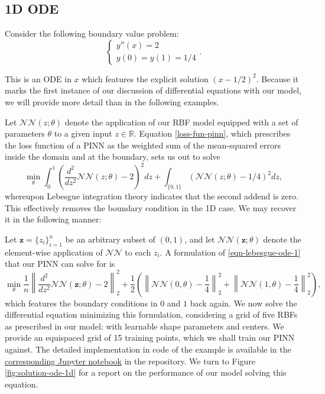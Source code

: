 \documentclass[12pt]{report} %
\newcommand{\tmmathbf}[1]{\ensuremath{\boldsymbol{#1}}}
\begin{document}
\subsection{1D ODE}

Consider the following boundary value problem:
\[ \left\{\begin{array}{l}
     y'' (x) = 2\\
     y (0) = y (1) = 1 / 4
   \end{array}\right. . \]

This is an ODE in $x$ which features the explicit solution $(x - 1 / 2)^2$.
Because it marks the first instance of our discussion of differential equations 
with our model, we will provide more detail than in the following examples.

Let $\mathcal{N}\mathcal{N} (z ; \theta)$ denote the application of our RBF
model equipped with a set of parameters $\theta$ to a given input $z \in
\mathbb{R}$. Equation \eqref{loss-fun-pinn}, which prescribes the loss function
of a PINN as the weighted sum of the mean-squared errors inside the domain and at 
the boundary, sets us out to solve
\begin{equation}
  \min_{\theta}  \int_0^1 \left( \frac{d^2}{d z^2} \mathcal{N}\mathcal{N} (z ;
  \theta) - 2 \right)^2 d z + \int_{\{ 0, 1 \}} (\mathcal{N}\mathcal{N} (z ;
  \theta) - 1 / 4)^2 d z, \label{eqn-lebesgue-ode-1}
\end{equation}
whereupon Lebesgue integration theory indicates that the second addend is zero.
This effectively removes the boundary condition in the 1D case. We may 
recover it in the following manner:

Let $\tmmathbf{z}= \{ z_i \}_{i = 1}^n$ be an arbitrary subset of $(0, 1)$,
and let $\mathcal{N}\mathcal{N} (\tmmathbf{z}; \theta)$ denote the
element-wise application of $\mathcal{N}\mathcal{N}$ to each $z_i$. A
formulation of \eqref{eqn-lebesgue-ode-1} that our PINN can solve for is
\[ \min_{\theta}  \frac{1}{n} \left\| \frac{d^2}{d z^2} \mathcal{N}\mathcal{N}
   (\tmmathbf{z}; \theta) - 2 \right\|_2^2 + \frac{1}{2} \left( \left\|
   \mathcal{N}\mathcal{N} (0, \theta) - \frac{1}{4} \right\|_2^2 + \left\|
   \mathcal{N}\mathcal{N} (1, \theta) - \frac{1}{4} \right\|_2^2 \right), \]
which features the boundary conditions in $0$ and $1$ back again. We now solve the 
differential equation minimizing this formulation, considering a grid of 
five RBFs as prescribed in our model: with learnable shape parameters and centers.
We provide an equispaced grid of 15 training points, which we shall train our 
PINN against.
The detailed implementation in code of the example is available in the 
\href{https://github.com/heqro/tfm-experiments/blob/main/introductory_notebooks/solving_diff_eqs/1d/ode_example_1.ipynb}{corresponding Jupyter notebook}
in the repository.
We turn to Figure \ref{fig:solution-ode-1d} for a report on the performance of our 
model solving this equation.
\end{document}
